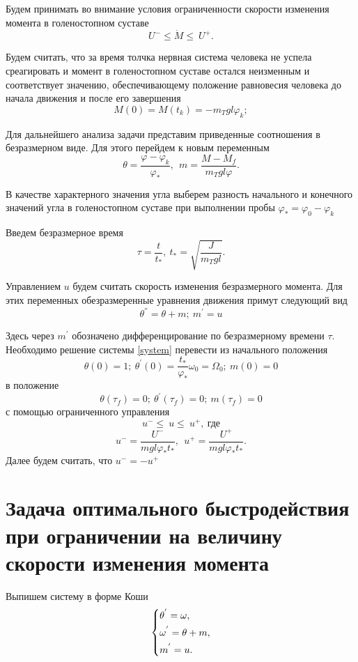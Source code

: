 \documentclass[a4paper,14pt]{article}
\theoremstyle{plain} %
\theoremstyle{definition} %
\theoremstyle{remark} %
\begin{document}
{Будем принимать во внимание условия ограниченности скорости изменения
момента в голеностопном суставе
\[
    U^-\leqslant\dot{M}\leqslant\ U^+.
\]

Будем считать, что за время толчка нервная система человека
не успела среагировать и момент в голеностопном суставе остался
неизменным и соответствует значению, обеспечивающему положение
равновесия человека до начала движения и после его завершения
\[
    M(0)=M\left(t_k\right)=-m_Tgl\varphi_k;
\]

Для дальнейшего анализа задачи представим приведенные
соотношения в безразмерном виде. Для этого перейдем
к новым переменным
\[
    \theta=\frac{\varphi-\varphi_k}{\varphi_\ast},\ \ m=\frac{M-M_f}{m_Tgl\varphi}.
\]

В качестве характерного значения угла выберем разность
начального и конечного значений угла в голеностопном
суставе при выполнении пробы $\varphi_\ast=\varphi_0-\varphi_k$

Введем безразмерное время
\[
    \tau=\frac{t}{t_\ast},\ t_\ast=\sqrt{\frac{J}{m_Tgl}}.
\]

Управлением $u$ будем считать скорость изменения безразмерного
момента. Для этих переменных обезразмеренные уравнения движения
примут следующий вид
\begin{equation}\label{system}
    \theta^{''}=\theta+m;\ m^{'}=u
\end{equation}

Здесь через $m^{'}$ обозначено дифференцирование по
безразмерному времени $\tau$. Необходимо решение системы \eqref{system}
перевести из начального положения
\[
    \theta(0)=1;\ \theta^{'}(0)=\frac{t_\ast}{\varphi_\ast}\omega_0=\Omega_0;\ m(0)=0
\]
в положение
\[
    \theta(\tau_f)=0;\ \theta^{'}(\tau_f)=0;\ m(\tau_f)=0
\]
с помощью ограниченного управления
\[
    u^-\leqslant\ u\leqslant\ u^+,\ \text{где}
\]
\[
    u^-=\frac{U^-}{mgl\varphi_\ast t_\ast},\ \ u^+=\frac{U^+}{mgl\varphi_\ast t_\ast}.
\]
Далее будем считать, что $u^-=-u^+$
\newpage
\section{Задача оптимального быстродействия при ограничении на величину скорости изменения момента}
Выпишем систему в форме Коши
\begin{equation}\label{koshisystem}
    \left\{ {\begin{aligned}
                 & \theta^{'} = \omega , \hfill   \\
                 & \omega^{'} = \theta+m , \hfill \\
                 & m^{'} = u . \hfill             \\
            \end{aligned}} \right.
\end{equation}

}
\end{document}
